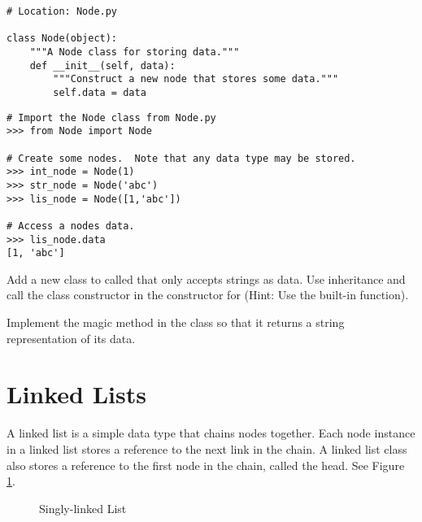 \begin{lstlisting}
# Location: Node.py

class Node(object):
	"""A Node class for storing data."""
	def __init__(self, data):
		"""Construct a new node that stores some data."""
		self.data = data
\end{lstlisting}

\begin{lstlisting}
# Import the Node class from Node.py
>>> from Node import Node

# Create some nodes.  Note that any data type may be stored.
>>> int_node = Node(1)
>>> str_node = Node('abc')
>>> lis_node = Node([1,'abc'])

# Access a nodes data.
>>> lis_node.data
[1, 'abc']
\end{lstlisting}

\begin{problem}
Add a new class to  called  that only accepts strings as data.
Use inheritance and call the  class constructor in the constructor for 
(Hint: Use the  built-in function).

Implement the  magic method in the  class so that it returns a string representation of its data.
\end{problem}

\section*{Linked Lists}

A linked list is a simple data type that chains nodes together.
Each node instance in a linked list stores a reference to the next link in the chain.
A linked list class also stores a reference to the first node in the chain, called the head.
See Figure \ref{fig:singly_linked}.

\begin{figure}
\centering
{}
\caption{Singly-linked List}
\label{fig:singly_linked}
\end{figure}

